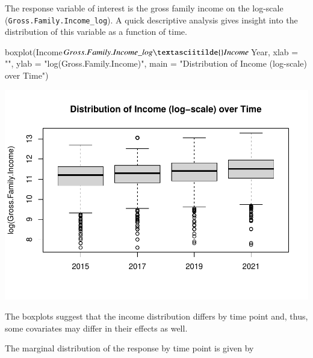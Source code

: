 \documentclass[a4paper, preprint, 3p,
authoryear]{elsarticle} %
\newenvironment{Shaded}{\begin{snugshade}}{\end{snugshade}}
\newcommand{\NormalTok}[1]{#1}
\newcommand{\pandocbounded}[1]{#1}
\begin{document}
The response variable of interest is the gross family income on the
log-scale (\texttt{Gross.Family.Income\_log}). A quick descriptive
analysis gives insight into the distribution of this variable as a
function of time.

\begin{Shaded}
\begin{Highlighting}[]
\NormalTok{boxplot(Income$Gross.Family.Income\_log \textasciitilde{} Income$Year,}
\NormalTok{        xlab = "", ylab = "log(Gross.Family.Income)",}
\NormalTok{        main = "Distribution of Income (log{-}scale) over Time")}
\end{Highlighting}
\end{Shaded}

\pandocbounded{\includegraphics[keepaspectratio]{Vignette-for-panelTVP_files/figure-latex/unnamed-chunk-12-1.pdf}}

The boxplots suggest that the income distribution differs by time point
and, thus, some covariates may differ in their effects as well.

The marginal distribution of the response by time point is given by

\begin{Shaded}
\end{Shaded}
\end{document}
